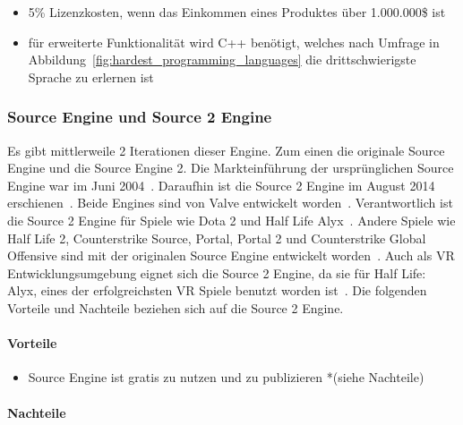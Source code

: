 \begin{itemize}
    \item 5\% Lizenzkosten, wenn das Einkommen eines Produktes über 1.000.000\$ ist~\cite{UNREAL_ENGINE_PRICING_2022}
    \item für erweiterte Funktionalität wird C++ benötigt, welches nach Umfrage in Abbildung~\ref{fig:hardest_programming_languages} die drittschwierigste Sprache zu erlernen ist
\end{itemize}

\subsubsection{Source Engine und Source 2 Engine}

Es gibt mittlerweile 2 Iterationen dieser Engine.
Zum einen die originale Source Engine und die Source Engine 2.
Die Markteinführung der ursprünglichen Source Engine war im Juni 2004~\cite{Bryan_Wirtz_SOURCE_ENGINE_2022}.
Daraufhin ist die Source 2 Engine im August 2014 erschienen~\cite{VALVE_DEVELOPER_COMMUNITY_SOURCE2}.
Beide Engines sind von Valve entwickelt worden~\cite{VALVE_DEVELOPER_COMMUNITY_SOURCE, VALVE_DEVELOPER_COMMUNITY_SOURCE2}.
Verantwortlich ist die Source 2 Engine für Spiele wie Dota 2 und Half Life Alyx~\cite{WIKIPEDIA_SOURCE2_ENGINE_GAME_LIST}.
Andere Spiele wie Half Life 2, Counterstrike Source, Portal, Portal 2 und Counterstrike Global Offensive sind mit der originalen Source Engine entwickelt worden~\cite{WIKIPEDIA_SOURCE_ENGINE_GAME_LIST}.
Auch als VR Entwicklungsumgebung eignet sich die Source 2 Engine, da sie für Half Life: Alyx, eines der erfolgreichsten VR Spiele benutzt worden ist~\cite{WIKIPEDIA_SOURCE2_ENGINE_GAME_LIST, Aden_Carter_2020}.
Die folgenden Vorteile und Nachteile beziehen sich auf die Source 2 Engine.

\paragraph{Vorteile}

\begin{itemize}
    \item Source Engine ist gratis zu nutzen und zu publizieren *(siehe Nachteile)
\end{itemize}


\paragraph{Nachteile}\label{pgr:cons}

